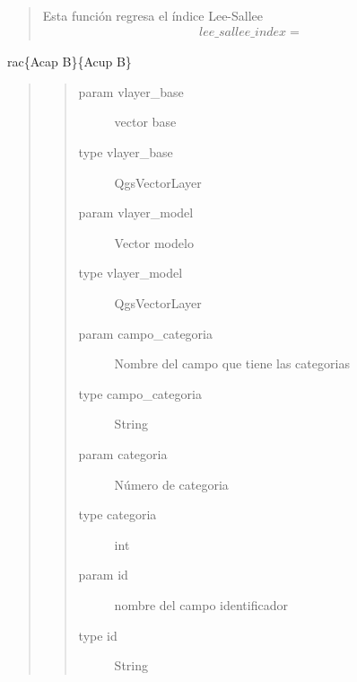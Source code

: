 \documentclass[letterpaper,10pt,spanish]{sphinxmanual}
\begin{document}
\begin{fulllineitems}
\label{\detokenize{leesallee:indice_lee_sallee.indice_lee_salee}}~\begin{quote}

Esta función regresa el índice Lee-Sallee
\begin{equation*}
\begin{split}lee\_sallee\_index =  \end{split}
\end{equation*}\end{quote}

rac\{Acap B\}\{Acup B\}
\begin{quote}
\begin{quote}\begin{description}
\item[{param vlayer\_base}] \leavevmode
vector base

\item[{type vlayer\_base}] \leavevmode
QgsVectorLayer

\item[{param vlayer\_model}] \leavevmode
Vector modelo

\item[{type vlayer\_model}] \leavevmode
QgsVectorLayer

\item[{param campo\_categoria}] \leavevmode
Nombre del campo que tiene las categorias

\item[{type campo\_categoria}] \leavevmode
String

\item[{param categoria}] \leavevmode
Número de categoria

\item[{type categoria}] \leavevmode
int

\item[{param id}] \leavevmode
nombre del campo identificador

\item[{type id}] \leavevmode
String

\end{description}\end{quote}
\end{quote}

\end{fulllineitems}
\end{document}
